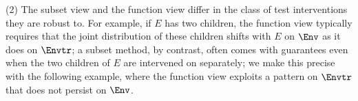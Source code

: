 (2) The subset view and the function view differ in the class of test interventions they are robust to. For example, if $E$ has two children, the function view typically requires that the joint distribution of these children shifts with $E$ on $\Env$ 
as 
it does on $\Envtr$;
a subset method, by contrast, often comes with guarantees even when the two children of $E$ are intervened on separately; we make this precise with the following example, where the function view exploits a pattern on $\Envtr$ that does not persist on $\Env$.

